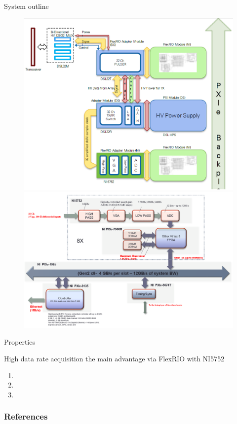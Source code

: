\documentclass[t,12pt,english
\ifx\beamermode\undefined\else,\beamermode\fi
]{beamer}
\begin{document}
\begin{frame}{System outline}

\begin{figure}[!htb]
\includegraphics[width=1\textwidth]{2.png}
\endminipage
{}
\centering
\includegraphics[width=1.3\textwidth]{4.png}
\endminipage
\end{figure}


\end{frame}

\begin{frame}{Properties}

\begin{block}{\footnotesize{High data rate acquisition the main advantage via FlexRIO with NI5752}}
\begin{enumerate} 
\vspace{0.05cm}
     \item \footnotesize{} 
     \item \footnotesize{}
     \item \footnotesize{}
\end{enumerate}
\end{block}


\end{frame}


\begin{frame}[allowframebreaks]
        \frametitle{References}
        
        
\end{frame}
\end{document}
